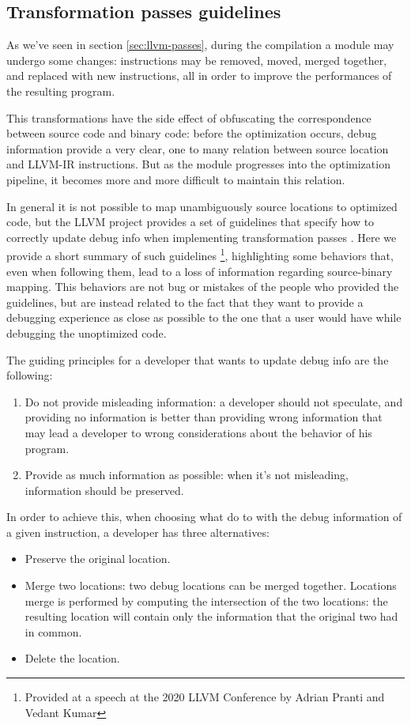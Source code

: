 \subsection{Transformation passes guidelines}
As we've seen in section \ref{sec:llvm-passes}, during the compilation a module may undergo some changes: instructions may be removed, moved, merged together, and replaced with new instructions, all in order to improve the performances of the resulting program. \par 
This transformations have the side effect of obfuscating the correspondence between source code and binary code: before the optimization occurs, debug information provide a very clear, one to many relation between source location and LLVM-IR instructions. But as the module progresses into the optimization pipeline, it becomes more and more difficult to maintain this relation. \par
In general it is not possible to map unambiguously source locations to optimized code, but the LLVM project provides a set of guidelines that specify how to correctly update debug info when implementing transformation passes \cite{llvm-guidelines}. \newline
Here we provide a short summary of such guidelines \footnote{Provided at a speech at the 2020 LLVM Conference by Adrian Pranti and Vedant Kumar}, highlighting some behaviors that, even when following them, lead to a loss of information regarding source-binary mapping. This behaviors are not bug or mistakes of the people who provided the guidelines, but are instead related to the fact that they want to provide a debugging experience as close as possible to the one that a user would have while debugging the unoptimized code. \par 
The guiding principles for a developer that wants to update debug info are the following:
\begin{enumerate}
\item Do not provide misleading information: a developer should not speculate, and providing no information is better than providing wrong information that may lead a developer to wrong considerations about the behavior of his program.
\item Provide as much information as possible: when it's not misleading, information should be preserved. 
\end{enumerate}
In order to achieve this, when choosing what do to with the debug information of a given instruction, a developer has three alternatives:
\begin{itemize}
\item Preserve the original location.
\item Merge two locations: two debug locations can be merged together. Locations merge is performed by computing the intersection of the two locations: the resulting location will contain only the information that the original two had in common.
\item Delete the location.
\end{itemize}
